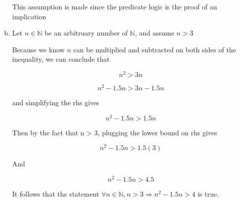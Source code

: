 \documentclass[12pt]{article}
\begin{document}
\begin{enumerate}[a.]
    This assumption is made since the predicate logic is the proof of an implication

    \item

    Let $n \in \mathbb{N}$ be an arbitruary number of $\mathbb{N}$, and assume $n > 3$

    Because we know $n$ can be multiplied and subtracted on both sides of the inequality, we can conclude that

    \begin{equation}
        n^2 > 3n
    \end{equation}

    \begin{equation}
        n^2 -1.5n > 3n - 1.5n
    \end{equation}

    and simplifying the rhs gives

    \begin{equation}
        n^2 -1.5n > 1.5n
    \end{equation}

    Then by the fact that n > 3, plugging the lower bound on rhs gives

    \begin{equation}
        n^2 -1.5n > 1.5(3)
    \end{equation}

    And

    \begin{equation}
        n^2 -1.5n > 4.5
    \end{equation}

    It follows that the statement $\forall n \in \mathbb{N}, n > 3 \Rightarrow n^2 - 1.5n > 4$ is true.

\end{enumerate}
\end{document}
